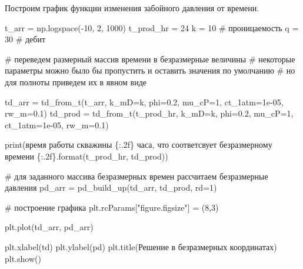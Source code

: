 \documentclass[
  russian,
  letterpaper,
  DIV=11,
  numbers=noendperiod,
  oneside]{scrartcl}
\newenvironment{Shaded}{\begin{snugshade}}{\end{snugshade}}
\newcommand{\BuiltInTok}[1]{\textcolor[rgb]{0.00,0.23,0.31}{#1}}
\newcommand{\CommentTok}[1]{\textcolor[rgb]{0.37,0.37,0.37}{#1}}
\newcommand{\DecValTok}[1]{\textcolor[rgb]{0.68,0.00,0.00}{#1}}
\newcommand{\FloatTok}[1]{\textcolor[rgb]{0.68,0.00,0.00}{#1}}
\newcommand{\NormalTok}[1]{\textcolor[rgb]{0.00,0.23,0.31}{#1}}
\newcommand{\OperatorTok}[1]{\textcolor[rgb]{0.37,0.37,0.37}{#1}}
\newcommand{\SpecialCharTok}[1]{\textcolor[rgb]{0.37,0.37,0.37}{#1}}
\newcommand{\StringTok}[1]{\textcolor[rgb]{0.13,0.47,0.30}{#1}}
\begin{document}
Построим график функции изменения забойного давления от времени.

\begin{Shaded}
\begin{Highlighting}[]
\NormalTok{t\_arr }\OperatorTok{=}\NormalTok{ np.logspace(}\OperatorTok{{-}}\DecValTok{10}\NormalTok{, }\DecValTok{2}\NormalTok{, }\DecValTok{1000}\NormalTok{)}
\NormalTok{t\_prod\_hr }\OperatorTok{=} \DecValTok{24}
\NormalTok{k }\OperatorTok{=} \DecValTok{10}   \CommentTok{\# проницаемость}
\NormalTok{q }\OperatorTok{=} \DecValTok{30}   \CommentTok{\# дебит}

\CommentTok{\# переведем размерный массив времени в безразмерные величины}
\CommentTok{\# некоторые параметры можно было бы пропустить и оставить значения по умолчанию}
\CommentTok{\# но для полноты приведем их в явном виде}

\NormalTok{td\_arr }\OperatorTok{=}\NormalTok{ td\_from\_t(t\_arr, }
\NormalTok{                   k\_mD}\OperatorTok{=}\NormalTok{k, phi}\OperatorTok{=}\FloatTok{0.2}\NormalTok{, mu\_cP}\OperatorTok{=}\DecValTok{1}\NormalTok{, ct\_1atm}\OperatorTok{=}\FloatTok{1e{-}05}\NormalTok{, rw\_m}\OperatorTok{=}\FloatTok{0.1}\NormalTok{)}
\NormalTok{td\_prod }\OperatorTok{=}\NormalTok{ td\_from\_t(t\_prod\_hr, }
\NormalTok{                    k\_mD}\OperatorTok{=}\NormalTok{k, phi}\OperatorTok{=}\FloatTok{0.2}\NormalTok{, mu\_cP}\OperatorTok{=}\DecValTok{1}\NormalTok{, ct\_1atm}\OperatorTok{=}\FloatTok{1e{-}05}\NormalTok{, rw\_m}\OperatorTok{=}\FloatTok{0.1}\NormalTok{)}

\BuiltInTok{print}\NormalTok{(}\StringTok{\textquotesingle{}время работы скважины }\SpecialCharTok{\{:.2f\}}\StringTok{ часа, что соответсвует безразмерному времени }\SpecialCharTok{\{:.2f\}}\StringTok{\textquotesingle{}}\NormalTok{.}\BuiltInTok{format}\NormalTok{(t\_prod\_hr, td\_prod))}

\CommentTok{\# для заданного массива безразмерных времен рассчитаем безразмерные давления}
\NormalTok{pd\_arr }\OperatorTok{=}\NormalTok{ pd\_build\_up(td\_arr, td\_prod, rd}\OperatorTok{=}\DecValTok{1}\NormalTok{)}

\CommentTok{\# построение графика}
\NormalTok{plt.rcParams[}\StringTok{"figure.figsize"}\NormalTok{] }\OperatorTok{=}\NormalTok{ (}\DecValTok{8}\NormalTok{,}\DecValTok{3}\NormalTok{)}

\NormalTok{plt.plot(td\_arr, pd\_arr)}

\NormalTok{plt.xlabel(}\StringTok{\textquotesingle{}td\textquotesingle{}}\NormalTok{)}
\NormalTok{plt.ylabel(}\StringTok{\textquotesingle{}pd\textquotesingle{}}\NormalTok{)}
\NormalTok{plt.title(}\StringTok{\textquotesingle{}Решение в безразмерных координатах\textquotesingle{}}\NormalTok{)}
\NormalTok{plt.show()}
\end{Highlighting}
\end{Shaded}
\end{document}

